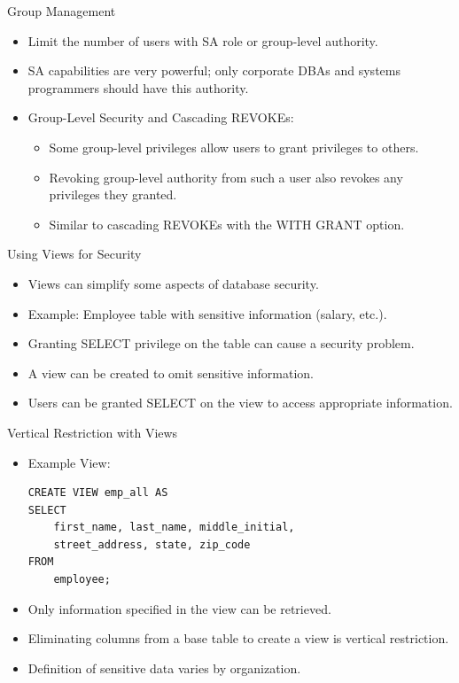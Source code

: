 \documentclass{beamer}
\begin{document}
\begin{frame}{Group Management}
    \begin{itemize}
        \item Limit the number of users with SA role or group-level authority.
        \item SA capabilities are very powerful; only corporate DBAs and systems programmers should have this authority.
        \item Group-Level Security and Cascading REVOKEs:
        \begin{itemize}
            \item Some group-level privileges allow users to grant privileges to others.
            \item Revoking group-level authority from such a user also revokes any privileges they granted.
            \item Similar to cascading REVOKEs with the WITH GRANT option.
        \end{itemize}
    \end{itemize}
\end{frame}

\begin{frame}{Using Views for Security}
    \begin{itemize}
        \item Views can simplify some aspects of database security.
        \item Example: Employee table with sensitive information (salary, etc.).
        \item Granting SELECT privilege on the table can cause a security problem.
        \item A view can be created to omit sensitive information.
        \item Users can be granted SELECT on the view to access appropriate information.
    \end{itemize}
\end{frame}

\begin{frame}[fragile]{Vertical Restriction with Views}
    \begin{itemize}
        \item Example View:
        {\scriptsize
        \begin{verbatim}
CREATE VIEW emp_all AS
SELECT
    first_name, last_name, middle_initial,
    street_address, state, zip_code
FROM
    employee;
        \end{verbatim}
        }
        \item Only information specified in the view can be retrieved.
        \item Eliminating columns from a base table to create a view is vertical restriction.
        \item Definition of sensitive data varies by organization.
    \end{itemize}
\end{frame}
\end{document}
